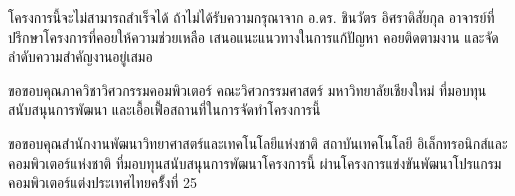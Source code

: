   \iffalse
    \begin{dedication}
      This document is dedicated to all Chiang Mai University students.
      
      Dedication page is optional.
    \end{dedication}
  \fi %
  
  \begin{acknowledgments}
    โครงการนี้จะไม่สามารถสำเร็จได้ ถ้าไม่ได้รับความกรุณาจาก อ.ดร. ชินวัตร อิศราดิสัยกุล 
    อาจารย์ที่ปรึกษาโครงการที่คอยให้ความช่วยเหลือ เสนอแนะแนวทางในการแก้ปัญหา 
    คอยติดตามงาน และจัดลำดับความสำคัญงานอยู่เสมอ

    ขอขอบคุณภาควิชาวิศวกรรมคอมพิวเตอร์ คณะวิศวกรรมศาสตร์ มหาวิทยาลัยเชียงใหม่ 
    ที่มอบทุนสนับสนุนการพัฒนา และเอื้อเฟื้อสถานที่ในการจัดทำโครงการนี้

    ขอขอบคุณสำนักงานพัฒนาวิทยาศาสตร์และเทคโนโลยีแห่งชาติ สถาบันเทคโนโลยี
    อิเล็กทรอนิกส์และคอมพิวเตอร์แห่งชาติ ที่มอบทุนสนับสนุนการพัฒนาโครงการนี้ 
    ผ่านโครงการแข่งขันพัฒนาโปรแกรมคอมพิวเตอร์แต่งประเทศไทยครั้้งที่ 25
    
  \end{acknowledgments}%
\fi %

\contentspage

\ifproject
  \figurelistpage
  
  \tablelistpage
\fi %



